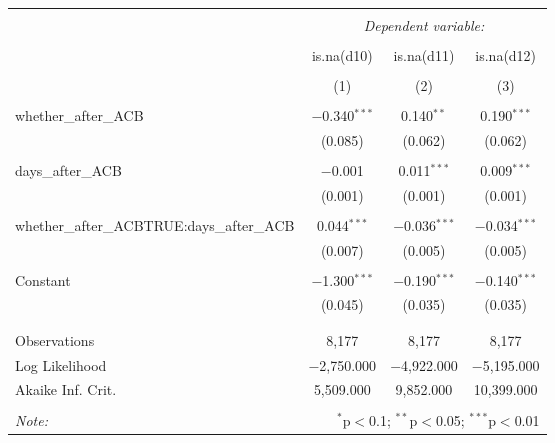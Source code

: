 \documentclass{article}\usepackage[]{graphicx}\usepackage[]{color}
\begin{document}
\begin{table}[!htbp] \centering 
  \caption{} 
  \label{} 
\begin{tabular}{@{\extracolsep{5pt}}lccc} 
\\[-1.8ex]\hline 
\hline \\[-1.8ex] 
 & \multicolumn{3}{c}{\textit{Dependent variable:}} \\ 
\cline{2-4} 
\\[-1.8ex] & is.na(d10) & is.na(d11) & is.na(d12) \\ 
\\[-1.8ex] & (1) & (2) & (3)\\ 
\hline \\[-1.8ex] 
 whether\_after\_ACB & $-$0.340$^{***}$ & 0.140$^{**}$ & 0.190$^{***}$ \\ 
  & (0.085) & (0.062) & (0.062) \\ 
  & & & \\ 
 days\_after\_ACB & $-$0.001 & 0.011$^{***}$ & 0.009$^{***}$ \\ 
  & (0.001) & (0.001) & (0.001) \\ 
  & & & \\ 
 whether\_after\_ACBTRUE:days\_after\_ACB & 0.044$^{***}$ & $-$0.036$^{***}$ & $-$0.034$^{***}$ \\ 
  & (0.007) & (0.005) & (0.005) \\ 
  & & & \\ 
 Constant & $-$1.300$^{***}$ & $-$0.190$^{***}$ & $-$0.140$^{***}$ \\ 
  & (0.045) & (0.035) & (0.035) \\ 
  & & & \\ 
\hline \\[-1.8ex] 
Observations & 8,177 & 8,177 & 8,177 \\ 
Log Likelihood & $-$2,750.000 & $-$4,922.000 & $-$5,195.000 \\ 
Akaike Inf. Crit. & 5,509.000 & 9,852.000 & 10,399.000 \\ 
\hline 
\hline \\[-1.8ex] 
\textit{Note:}  & \multicolumn{3}{r}{$^{*}$p$<$0.1; $^{**}$p$<$0.05; $^{***}$p$<$0.01} \\ 
\end{tabular} 
\end{table} 
\end{document}
